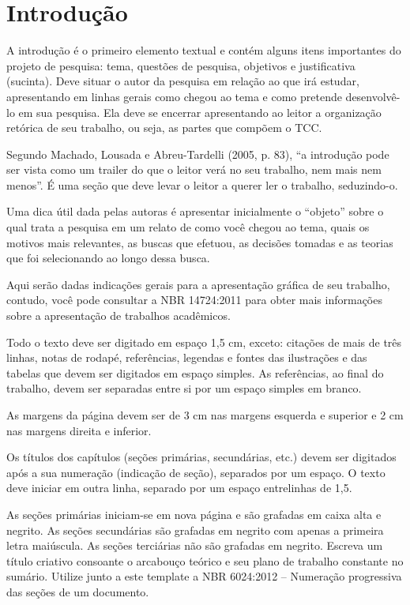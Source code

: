 \chapter{Introdução}

A introdução é o primeiro elemento textual e contém alguns itens importantes do projeto de pesquisa: tema, questões de pesquisa, objetivos e justificativa (sucinta). Deve situar o autor da pesquisa em relação ao que irá estudar, apresentando em linhas gerais como chegou ao tema e como pretende desenvolvê-lo em sua pesquisa. Ela deve se encerrar apresentando ao leitor a organização retórica de seu trabalho, ou seja, as partes que compõem o TCC.

Segundo Machado, Lousada e Abreu-Tardelli (2005, p. 83), “a introdução pode ser vista como um trailer do que o leitor verá no seu trabalho, nem mais nem menos”. É uma seção que deve levar o leitor a querer ler o trabalho, seduzindo-o.

Uma dica útil dada pelas autoras é apresentar inicialmente o “objeto” sobre o qual trata a pesquisa em um relato de como você chegou ao tema, quais os motivos mais relevantes, as buscas que efetuou, as decisões tomadas e as teorias que foi selecionando ao longo dessa busca.

Aqui serão dadas indicações gerais para a apresentação gráfica de seu trabalho, contudo, você pode consultar a NBR 14724:2011 para obter mais informações sobre a apresentação de trabalhos acadêmicos.

Todo o texto deve ser digitado em espaço 1,5 cm, exceto: citações de mais de três linhas, notas de rodapé, referências, legendas e fontes das ilustrações e das tabelas que devem ser digitados em espaço simples. As referências, ao final do trabalho, devem ser separadas entre si por um espaço simples em branco.

As margens da página devem ser de 3 cm nas margens esquerda e superior e 2 cm nas margens direita e inferior.

Os títulos dos capítulos (seções primárias, secundárias, etc.) devem ser digitados após a sua numeração (indicação de seção), separados por um espaço. O texto deve iniciar em outra linha, separado por um espaço entrelinhas de 1,5. 

As seções primárias iniciam-se em nova página e são grafadas em caixa alta e negrito. As seções secundárias são grafadas em negrito com apenas a primeira letra maiúscula. As seções terciárias não são grafadas em negrito. Escreva um título criativo consoante o arcabouço teórico e seu plano de trabalho constante no sumário. Utilize junto a este template a NBR 6024:2012 – Numeração progressiva das seções de um documento.

